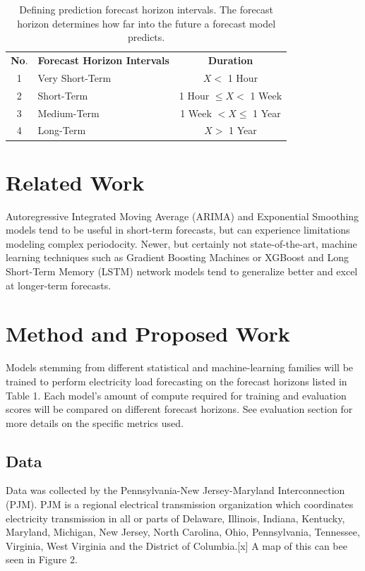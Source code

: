 \documentclass[sigconf]{acmart}
\begin{document}
\begin{table}
\centering
\caption{Defining prediction forecast horizon intervals. The forecast horizon determines how far into the future a forecast model predicts.}
\begin{tabular}{clc}
\toprule
\hfill \textbf{No}. & \hfil \textbf{Forecast Horizon Intervals} & \textbf{Duration}\\
\cmidrule(lr){1-1}\cmidrule(rl){2-2}\cmidrule(rl){3-3}
  1 & Very Short-Term & $ X < $ 1 Hour \\
  2 & Short-Term  & 1 Hour $ \leq X < $ 1 Week  \\   
  3 & Medium-Term & 1 Week $ < X \leq $ 1 Year  \\   
  4 & Long-Term & $ X > $ 1 Year  \\ 
  \bottomrule
\end{tabular}
\end{table}

\section{Related Work}
Autoregressive Integrated Moving Average (ARIMA) and Exponential Smoothing models tend to be useful in short-term forecasts, but can experience limitations modeling complex periodocity. Newer, but certainly not state-of-the-art, machine learning techniques such as Gradient Boosting Machines or XGBoost and Long Short-Term Memory (LSTM) network models tend to generalize better and excel at longer-term forecasts.

\section{Method and Proposed Work}
Models stemming from different statistical and machine-learning families will be trained to perform electricity load forecasting on the forecast horizons listed in Table 1. Each model's amount of compute required for training and evaluation scores will be compared on different forecast horizons. See evaluation section for more details on the specific metrics used.

  \subsection{Data}
  Data was collected by the Pennsylvania-New Jersey-Maryland Interconnection (PJM). PJM is a regional electrical transmission organization which coordinates electricity transmission in all or parts of Delaware, Illinois, Indiana, Kentucky, Maryland, Michigan, New Jersey, North Carolina, Ohio, Pennsylvania, Tennessee, Virginia, West Virginia and the District of Columbia.[x] A map of this can bee seen in Figure 2.
  
\end{document}

